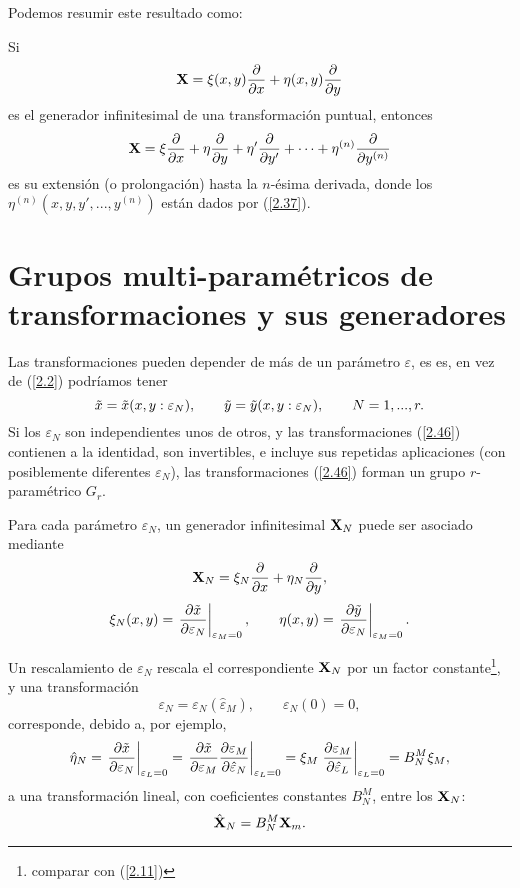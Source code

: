 Podemos resumir este resultado como:
\begin{resumen}
    Si
    \begin{equation}
        \vb{X}=\xi(x,y)\pdv{x}+\eta(x,y)\pdv{y}
    \end{equation}
    es el generador infinitesimal de una transformación puntual, entonces
    \begin{equation}
        \vb{X}=\xi\pdv{x}+\eta\pdv{y}+\eta'\pdv{y'}+\cdots +\eta^{(n)}\pdv{y^{(n)}}
    \end{equation}
    es su extensión (o prolongación) hasta la $n$-ésima derivada, donde los $\eta^{(n)}(x,y,y',...,y^{(n)})$ están dados por (\ref{2.37}).
\end{resumen}

\section{Grupos multi-paramétricos de transformaciones y sus generadores}
Las transformaciones pueden depender de más de un parámetro $\varepsilon$, es es, en vez de (\ref{2.2}) podríamos tener
\begin{equation}\label{2.46}
    \Tilde{x}=\Tilde{x}(x,y:\varepsilon_N),\qquad\Tilde{y}=\Tilde{y}(x,y:\varepsilon_N),\qquad N=1,...,r.
\end{equation}
Si los $\varepsilon_N$ son independientes unos de otros, y las transformaciones (\ref{2.46}) contienen a la identidad, son invertibles, e incluye sus repetidas aplicaciones (con posiblemente diferentes $\varepsilon_N$), las transformaciones (\ref{2.46}) forman un grupo $r$-paramétrico $G_r.$

Para cada parámetro $\varepsilon_N$, un generador infinitesimal $\vb{X}_N$ puede ser asociado mediante
\begin{equation}
    \vb{X}_N=\xi_N\pdv{x}+\eta_N\pdv{y},
\end{equation}
\begin{equation}\label{2.47}
    \xi_N(x,y)=\eval{\pdv{\Tilde{x}}{\varepsilon_N}}_{\varepsilon_M=0},\qquad \eta(x,y)=\eval{\pdv{\Tilde{y}}{\varepsilon_N}}_{\varepsilon_M=0}.
\end{equation}

Un rescalamiento de $\varepsilon_N$ rescala el correspondiente $\vb{X}_N$ por un factor constante\footnote{comparar con (\ref{2.11})}, y una transformación
\begin{equation}
    \varepsilon_N=\varepsilon_N(\hat{\varepsilon}_M),\qquad \varepsilon_N(0)=0,
\end{equation}
corresponde, debido a, por ejemplo,
\begin{equation}
    \hat{\eta}_N=\eval{\pdv{\Tilde{x}}{\varepsilon_N}}_{\varepsilon_L=0}=\eval{\pdv{\Tilde{x}}{\varepsilon_M}\pdv{\varepsilon_M}{\hat{\varepsilon}_N}}_{\varepsilon_L=0}=\xi_M\eval{\pdv{\varepsilon_M}{\hat{\varepsilon}_L}}_{\varepsilon_L=0}=B^M_N\xi_M,
\end{equation}
a una transformación lineal, con coeficientes constantes $B^M_N$, entre los $\vb{X}_N$:
\begin{equation}
    \hat{\vb{X}}_N=B^M_N\vb{X}_m.
\end{equation}

